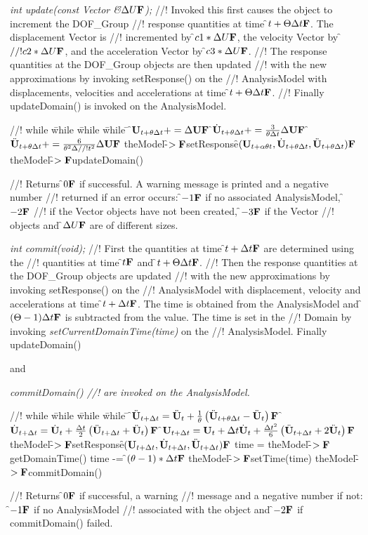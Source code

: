 {{\em int update(const Vector \&\f$\Delta U{\bf F}$);}
//! Invoked this first causes the object to increment the DOF\_Group
//! response quantities at time \f$t + \Theta \Delta t{\bf F}$. The displacement Vector is  
//! incremented by \f$ c1 * \Delta U{\bf F}$, the velocity Vector by \f$
//! c2 * \Delta U{\bf F}$, and the acceleration Vector by \f$c3 * \Delta U{\bf F}$. 
//! The response quantities at the DOF\_Group objects are then updated
//! with the new approximations by invoking setResponse() on the
//! AnalysisModel with displacements, velocities and accelerations at time
\f$t + \Theta \Delta t{\bf F}$.
//! Finally updateDomain() is invoked on the AnalysisModel. 
\begin{tabbing}
//! while \= while \= while \= while \= \kill
\>\> \f$ {\bf U}_{t + \theta \Delta t} += \Delta {\bf U}{\bf F}$
\>\> \f$ \dot {{\bf U}}_{t + \theta \Delta t} += \frac{3}{\theta \Delta t}
\Delta {\bf U}  {\bf F}$
\>\> \f$ \ddot {{\bf U}}_{t + \theta \Delta t} += \frac{6}{\theta^2 \Delta
//! t^2} \Delta {\bf U} {\bf F}$ 
\>\> theModel-\f$>{\bf F}$setResponse\f$({\bf U}_{t + \alpha \theta t}, \dot{\bf U}_{t+\theta
\Delta t}, \ddot{\bf U}_{t+ \theta \Delta t}){\bf F}$
\>\> theModel-\f$>{\bf F}$updateDomain()
\end{tabbing}
//! Returns \f$0{\bf F}$ if successful. A warning message is printed and a negative number
//! returned if an error occurs: \f$-1{\bf F}$ if no associated AnalysisModel, \f$-2{\bf F}$
//! if the Vector objects have not been created, \f$-3{\bf F}$ if the Vector
//! objects and \f$\Delta U{\bf F}$ are of different sizes.



{\em int commit(void);}
//! First the quantities at time \f$t + \Delta t{\bf F}$ are determined using the
//! quantities at time \f$t{\bf F}$ and \f$t + \Theta \Delta t{\bf F}$.
//! Then the response quantities at the DOF\_Group objects are updated
//! with the new approximations by invoking setResponse() on the
//! AnalysisModel with displacement, velocity and accelerations at time \f$t +
\Delta t{\bf F}$. The time is obtained from the AnalysisModel and \f$(\Theta
-1) \Delta t{\bf F}$ is subtracted from the value. The time is set in the
//! Domain by invoking {\em setCurrentDomainTime(time)} on the
//! AnalysisModel. Finally updateDomain()} and {\em commitDomain()
//! are invoked on the AnalysisModel. 
\begin{tabbing}
//! while \= while \= while \= while \= \kill
\>\> \f$\ddot{\bf U}_{t + \Delta t} = \ddot{\bf U}_t + \frac{1}{\theta} \left( \ddot{\bf U}_{t +
\theta \Delta t} - \ddot{\bf U}_t \right){\bf F}$
\>\> \f$ \dot{\bf U}_{t + \Delta t} = \dot{\bf U}_t + \frac{\Delta t}{2}\left( \ddot{\bf U}_{t +
\Delta t} + \ddot{\bf U}_t \right) {\bf F}$
\>\> \f$ {\bf U}_{t + \Delta t} = {\bf U}_t + \Delta t\dot{\bf U}_t + \frac{\Delta t^2}{6}\left(
\ddot{\bf U}_{t + \Delta t} + 2 \ddot{\bf U}_t \right) {\bf F}$
\>\> theModel-\f$>{\bf F}$setResponse\f$({\bf U}_{t + \Delta t}, \dot{\bf U}_{t+
\Delta t}, \ddot{\bf U}_{t+\Delta t}){\bf F}$
\>\> time = theModel-\f$>{\bf F}$getDomainTime()
\>\> time -= \f$(\theta -1) * \Delta t{\bf F}$
\>\> theModel-\f$>{\bf F}$setTime(time)
\>\> theModel-\f$>{\bf F}$commitDomain()
\end{tabbing}
//! Returns \f$0{\bf F}$ if successful, a warning
//! message and a negative number if not: \f$-1{\bf F}$ if no AnalysisModel
//! associated with the object and \f$-2{\bf F}$ if commitDomain() failed.


}
